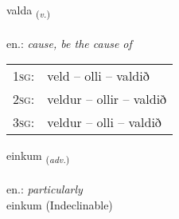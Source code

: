 \documentclass[frontgrid, backgrid]{flacards}\usepackage[]{graphicx}\usepackage[]{xcolor}
\begin{document}
\renewcommand{\blhead}{\vskip5pt {\small\bfseries\footnotesize Sagnorð | Verb }}
\renewcommand{\bcfoot}{\vskip5pt \hspace{2pt}{\small\bfseries\footnotesize 1K}}


{valda \small{\textsubscript{(\textit{v.})}} \\[1ex] %
\textphonetic{[valta]} \\
en.: \emph{cause, be the cause of} \\  [2ex]
\renewcommand*{\arraystretch}{0.8}
\begin{tabular}{p{1cm}l}
\textsc{1sg}: & veld -- olli -- valdið \\ 
\textsc{2sg}: & veldur -- ollir -- valdið \\ 
\textsc{3sg}: & veldur -- olli -- valdið \\ 
\end{tabular}
}


\renewcommand{\flhead}{\vskip5pt \fboxsep=0pt {\small\bfseries\footnotesize Atviksorð | Adverb}}
\renewcommand{\fcfoot}{\vskip5pt \fboxsep=0pt \hspace{2pt}{\small\bfseries\footnotesize 1K}}

\renewcommand{\blhead}{\vskip5pt {\small\bfseries\footnotesize Atviksorð | Adverb }}
\renewcommand{\bcfoot}{\vskip5pt \hspace{2pt}{\small\bfseries\footnotesize 1K}}


{einkum \small{\textsubscript{(\textit{adv.})}} \\[1ex]
 \\
en.: \emph{particularly} \\  [2ex]
einkum (Indeclinable)}

\renewcommand{\flhead}{\vskip5pt \fboxsep=0pt {\small\bfseries\footnotesize Nafnorð | Noun}}
\renewcommand{\fcfoot}{\vskip5pt \fboxsep=0pt \hspace{2pt}{\small\bfseries\footnotesize 1K}}

\renewcommand{\blhead}{\vskip5pt {\small\bfseries\footnotesize Nafnorð | Noun }}
\renewcommand{\bcfoot}{\vskip5pt \hspace{2pt}{\small\bfseries\footnotesize 1K}}
\end{document}
